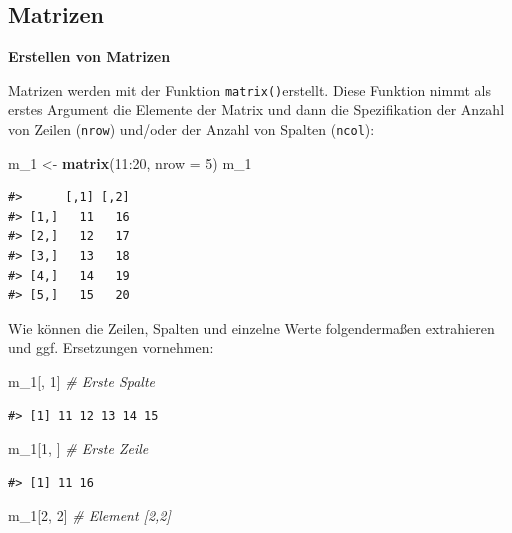 \documentclass[]{tufte-book}
\newenvironment{Shaded}{}{}
\newcommand{\KeywordTok}[1]{\textcolor[rgb]{0.00,0.44,0.13}{\textbf{#1}}}
\newcommand{\DataTypeTok}[1]{\textcolor[rgb]{0.56,0.13,0.00}{#1}}
\newcommand{\DecValTok}[1]{\textcolor[rgb]{0.25,0.63,0.44}{#1}}
\newcommand{\StringTok}[1]{\textcolor[rgb]{0.25,0.44,0.63}{#1}}
\newcommand{\CommentTok}[1]{\textcolor[rgb]{0.38,0.63,0.69}{\textit{#1}}}
\newcommand{\OperatorTok}[1]{\textcolor[rgb]{0.40,0.40,0.40}{#1}}
\newcommand{\NormalTok}[1]{#1}
\begin{document}
\subsection{Matrizen}\label{matrizen}

\textbf{Erstellen von Matrizen}

Matrizen werden mit der Funktion \texttt{matrix()}erstellt. Diese
Funktion nimmt als erstes Argument die Elemente der Matrix und dann die
Spezifikation der Anzahl von Zeilen (\texttt{nrow}) und/oder der Anzahl
von Spalten (\texttt{ncol}):

\begin{Shaded}
\begin{Highlighting}[]
\NormalTok{m_}\DecValTok{1}\NormalTok{ <-}\StringTok{ }\KeywordTok{matrix}\NormalTok{(}\DecValTok{11}\OperatorTok{:}\DecValTok{20}\NormalTok{, }\DataTypeTok{nrow =} \DecValTok{5}\NormalTok{)}
\NormalTok{m_}\DecValTok{1}
\end{Highlighting}
\end{Shaded}

\begin{verbatim}
#>      [,1] [,2]
#> [1,]   11   16
#> [2,]   12   17
#> [3,]   13   18
#> [4,]   14   19
#> [5,]   15   20
\end{verbatim}

Wie können die Zeilen, Spalten und einzelne Werte folgendermaßen
extrahieren und ggf. Ersetzungen vornehmen:

\begin{Shaded}
\begin{Highlighting}[]
\NormalTok{m_}\DecValTok{1}\NormalTok{[, }\DecValTok{1}\NormalTok{]  }\CommentTok{# Erste Spalte}
\end{Highlighting}
\end{Shaded}

\begin{verbatim}
#> [1] 11 12 13 14 15
\end{verbatim}

\begin{Shaded}
\begin{Highlighting}[]
\NormalTok{m_}\DecValTok{1}\NormalTok{[}\DecValTok{1}\NormalTok{, ]  }\CommentTok{# Erste Zeile}
\end{Highlighting}
\end{Shaded}

\begin{verbatim}
#> [1] 11 16
\end{verbatim}

\begin{Shaded}
\begin{Highlighting}[]
\NormalTok{m_}\DecValTok{1}\NormalTok{[}\DecValTok{2}\NormalTok{, }\DecValTok{2}\NormalTok{]  }\CommentTok{# Element [2,2]}
\end{Highlighting}
\end{Shaded}
\end{document}
